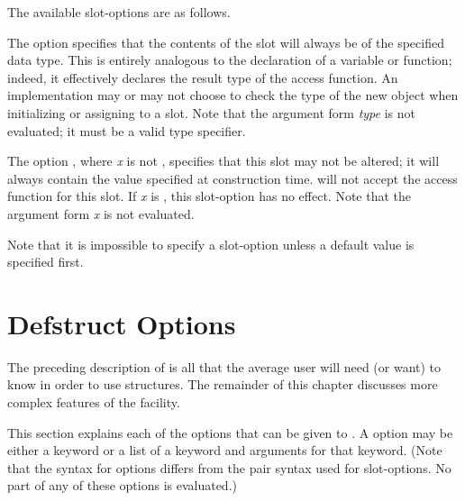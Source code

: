 The available slot-options are as follows.
\begin{flushdesc}
\item[\cd{:type}]
The option  specifies that the contents of the
slot will always be of the specified data type.  This is entirely
analogous to the declaration of a variable or function; indeed, it
effectively declares the result type of the access function.  An
implementation may or may not choose to check the type of the new object
when initializing or assigning to a slot.
Note that the argument form {\it type} is not evaluated;
it must be a valid type specifier.

\item[\cd{:read-only}]
The option , where {\it x} is not {\false},
specifies that this slot may not be
altered; it will always contain the value specified at construction time.
 will not accept the access function for this slot.
If {\it x} is {\false}, this slot-option has no effect.
Note that the argument form {\it x} is not evaluated.
\end{flushdesc}

Note that it is impossible to specify a slot-option unless
a default value is specified first.

\section{Defstruct Options}
\label{DEFSTRUCT-OPTIONS}
\label{Defstruct-Hairy-Stuff}

The preceding description of  is all that the average
user will need (or want) to know in order to use structures.
The remainder of this chapter discusses more complex features of
the  facility.

This section explains each of the options that can be given to .
A  option may be either a keyword
or a list of a keyword and arguments for that keyword.
(Note that the syntax for  options differs from
the pair syntax used for slot-options.  No part of any of these options
is evaluated.)


